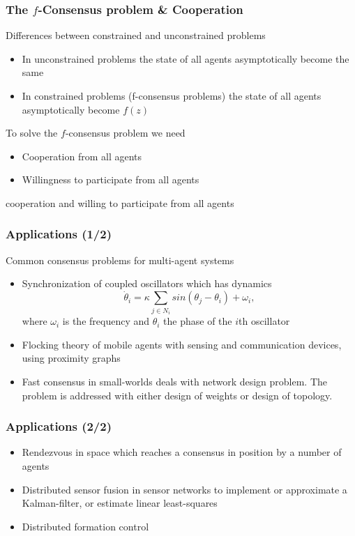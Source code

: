 \documentclass{beamer}
\begin{document}

\begin{frame}
\frametitle{The $f$-Consensus problem \& Cooperation}
Differences between constrained and unconstrained problems
\begin{itemize}
\item In unconstrained problems the state of all agents asymptotically become the same  
\item In constrained problems (f-consensus problems) the state of all agents asymptotically become $f(z)$ 
\end{itemize}
\vspace{0.2cm}
To solve the $f$-consensus problem we need 
\begin{itemize}
\item Cooperation from all agents
\item Willingness to participate from all agents
\end{itemize}
cooperation and willing to participate from all agents
\end{frame}


\begin{frame}
\frametitle{Applications (1/2)}
Common consensus problems for multi-agent systems
\begin{itemize}
\item Synchronization of coupled oscillators which has dynamics
\begin{equation*}
\dot{\theta}_i = \kappa \sum_{j \in N_i}sin(\theta_j-\theta_i) + \omega_i,
\end{equation*}
where $\omega_i$ is the frequency and $\theta_i$ the phase of the $i$th oscillator
\item Flocking theory of mobile agents with sensing and communication devices, using proximity graphs
\item Fast consensus in small-worlds deals with network design problem. The problem is addressed with either design of weights or design of topology.
\end{itemize}
\end{frame}


\begin{frame}
\frametitle{Applications (2/2)}
\begin{itemize}
\item Rendezvous in space which reaches a consensus in position by a number of agents
\item Distributed sensor fusion in sensor networks to implement or approximate a Kalman-filter, or estimate linear least-squares
\item Distributed formation control
\end{itemize}
\end{frame}
\end{document}
